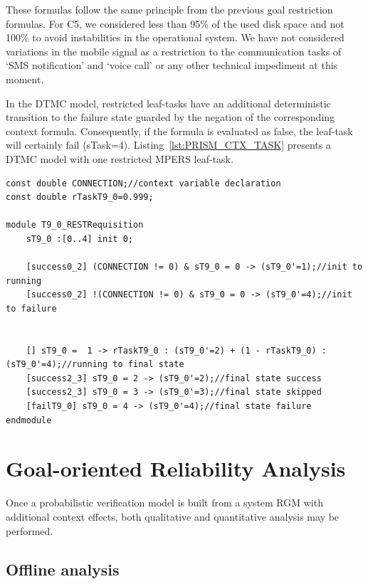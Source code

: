 These formulas follow the same principle from the previous goal restriction formulas. For C5, we considered less than 95\% of the used disk space and not 100\% to avoid instabilities in the operational system. We have not considered variations in the mobile signal as a restriction to the communication tasks of `SMS notification' and `voice call' or any other technical impediment at this moment. 

In the DTMC model, restricted leaf-tasks have an additional deterministic transition to the failure state guarded by the negation of the corresponding context formula. Consequently, if the formula is evaluated as false, the leaf-task will certainly fail (sTask=4). Listing~\ref{lst:PRISM_CTX_TASK} presents a DTMC model with one restricted MPERS leaf-task.
\medskip

\begin{lstlisting}[language=Prism, caption={Variable declaration and corresponding module with a context restriction formula.},label={lst:PRISM_CTX_TASK}] 
const double CONNECTION;//context variable declaration
const double rTaskT9_0=0.999;

module T9_0_RESTRequisition
	sT9_0 :[0..4] init 0;
	
	[success0_2] (CONNECTION != 0) & sT9_0 = 0 -> (sT9_0'=1);//init to running
	[success0_2] !(CONNECTION != 0) & sT9_0 = 0 -> (sT9_0'=4);//init to failure


	[] sT9_0 =  1 -> rTaskT9_0 : (sT9_0'=2) + (1 - rTaskT9_0) : (sT9_0'=4);//running to final state
	[success2_3] sT9_0 = 2 -> (sT9_0'=2);//final state success
	[success2_3] sT9_0 = 3 -> (sT9_0'=3);//final state skipped
	[failT9_0] sT9_0 = 4 -> (sT9_0'=4);//final state failure
endmodule
\end{lstlisting}

\section{Goal-oriented Reliability Analysis}

Once a probabilistic verification model is built from a system RGM with additional context effects, both qualitative and quantitative analysis may be performed. 

\subsection{Offline analysis}


